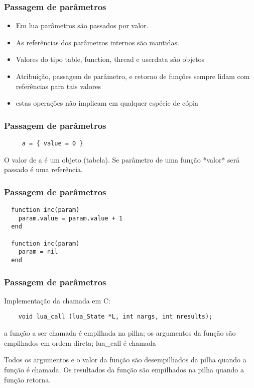 \begin{frame}
  \frametitle{Passagem de parâmetros}
  \begin{block}{}
    \begin{itemize}
    \item Em lua parâmetros são passados por valor.
    \item As referências dos parâmetros internos são mantidas.
    \item Valores do tipo table, function, thread e userdata são objetos
    \item Atribuição, passagem de parâmetro, e retorno de
          funções sempre lidam com referências para tais valores
    \item estas operações não implicam em qualquer espécie de cópia
    \end{itemize}
  \end{block}
\end{frame}

\begin{frame}[fragile]
  \frametitle{Passagem de parâmetros}
  \begin{block}{}
   \begin{lstlisting}
     a = { value = 0 }
   \end{lstlisting}
   \begin{block}{}
     O valor de a é um objeto (tabela). Se parâmetro de
     uma função *valor* será passado é uma
     referência.
   \end{block}
  \end{block}
\end{frame}

\begin{frame}[fragile]
  \frametitle{Passagem de parâmetros}
  \begin{lstlisting}
  function inc(param)
    param.value = param.value + 1
  end
  
  function inc(param)
    param = nil
  end
  \end{lstlisting}
\end{frame}

\begin{frame}[fragile]
  \frametitle{Passagem de parâmetros}
  \begin{block}{}
    Implementação da chamada em C:
    
    \begin{lstlisting}
    void lua_call (lua_State *L, int nargs, int nresults);
    \end{lstlisting}
    
    a função a ser chamada é empilhada na pilha;
    os argumentos da função são empilhados em ordem direta;
    lua_call é chamada 
    
    Todos os argumentos e o valor da função são desempilhados
    da pilha quando a função é chamada. 
    Os resultados da função são empilhados na pilha quando
    a função retorna. 
  \end{block}
\end{frame}
